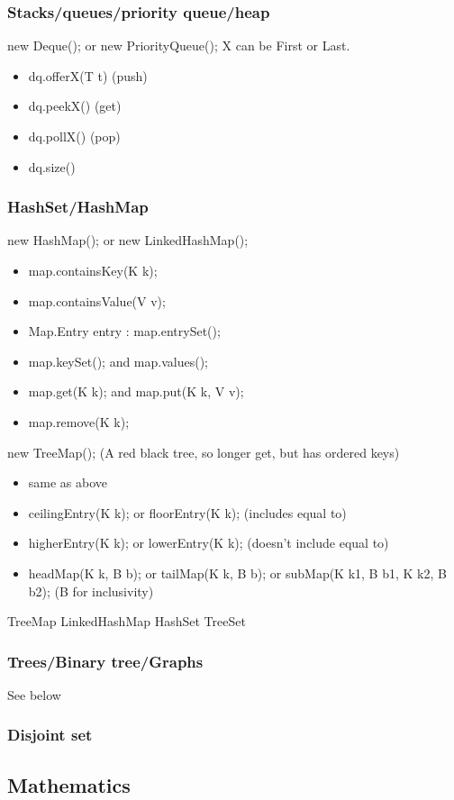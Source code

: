 \documentclass{article}
\begin{document}
\subsubsection{Stacks/queues/priority queue/heap}
new Deque(); or new PriorityQueue();
X can be First or Last.
\begin{itemize}
    \item dq.offerX(T t) (push)
    \item dq.peekX() (get)
    \item dq.pollX() (pop)
    \item dq.size()
\end{itemize}
\subsubsection{HashSet/HashMap}
new HashMap(); or new LinkedHashMap();
\begin{itemize}
    \item map.containsKey(K k);
    \item map.containsValue(V v);
    \item Map.Entry entry : map.entrySet();
    \item map.keySet(); and map.values();
    \item map.get(K k); and map.put(K k, V v);
    \item map.remove(K k);
\end{itemize}
new TreeMap(); (A red black tree, so longer get, but has ordered keys)
\begin{itemize}
    \item same as above
    \item ceilingEntry(K k); or floorEntry(K k); (includes equal to)
    \item higherEntry(K k); or lowerEntry(K k); (doesn't include equal to)
    \item headMap(K k, B b); or tailMap(K k, B b); or subMap(K k1, B b1, K k2, B b2); (B for inclusivity)
\end{itemize}
TreeMap
LinkedHashMap
HashSet
TreeSet
\subsubsection{Trees/Binary tree/Graphs}
See below
\subsubsection{Disjoint set}

\subsection{Mathematics}
\end{document}
